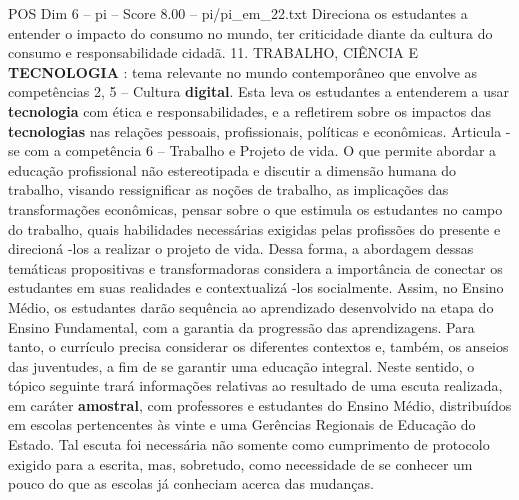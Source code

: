 \begin{textsample}{POS Dim 6 – pi – Score 8.00 – pi/pi\_em\_22.txt}
Direciona os estudantes a entender o impacto do consumo no mundo, ter criticidade diante da cultura do consumo e responsabilidade cidadã. 11.
TRABALHO, CIÊNCIA E \textbf{TECNOLOGIA} : tema relevante no mundo contemporâneo que envolve as competências 2, 5 – Cultura \textbf{digital}.
Esta leva os estudantes a entenderem a usar \textbf{tecnologia} com ética e responsabilidades, e a refletirem sobre os impactos das \textbf{tecnologias} nas relações pessoais, profissionais, políticas e econômicas.
Articula -se com a competência 6 – Trabalho e Projeto de vida.
O que permite abordar a educação profissional não estereotipada e discutir a dimensão humana do trabalho, visando ressignificar as noções de trabalho, as implicações das transformações econômicas, pensar sobre o que estimula os estudantes no campo do trabalho, quais habilidades necessárias exigidas pelas profissões do presente e direcioná -los a realizar o projeto de vida.
Dessa forma, a abordagem dessas temáticas propositivas e transformadoras considera a importância de conectar os estudantes em suas realidades e contextualizá -los socialmente.
Assim, no Ensino Médio, os estudantes darão sequência ao aprendizado desenvolvido na etapa do Ensino Fundamental, com a garantia da progressão das aprendizagens.
Para tanto, o currículo precisa considerar os diferentes contextos e, também, os anseios das juventudes, a fim de se garantir uma educação integral.
Neste sentido, o tópico seguinte trará informações relativas ao resultado de uma escuta realizada, em caráter \textbf{amostral}, com professores e estudantes do Ensino Médio, distribuídos em escolas pertencentes às vinte e uma Gerências Regionais de Educação do Estado.
Tal escuta foi necessária não somente como cumprimento de protocolo exigido para a escrita, mas, sobretudo, como necessidade de se conhecer um pouco do que as escolas já conheciam acerca das mudanças.

\end{textsample}
